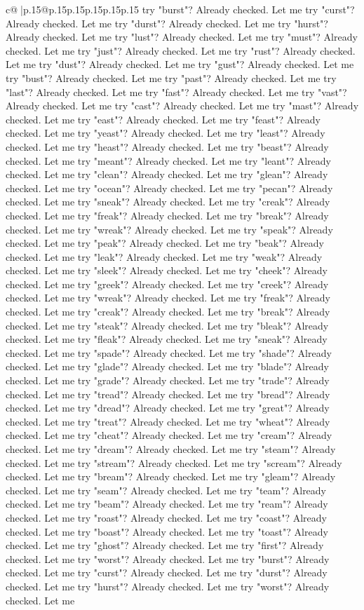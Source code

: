 \documentclass{article}
\begin{document}
{\begin{supertabular}{c@{$\;$}|p{.15\linewidth}@{}p{.15\linewidth}p{.15\linewidth}p{.15\linewidth}p{.15\linewidth}p{.15\linewidth}}
{{{try "burst"? Already checked. Let me try "curst"? Already checked. Let me try "durst"? Already checked. Let me try "hurst"? Already checked. Let me try "lust"? Already checked. Let me try "must"? Already checked. Let me try "just"? Already checked. Let me try "rust"? Already checked. Let me try "dust"? Already checked. Let me try "gust"? Already checked. Let me try "bust"? Already checked. Let me try "past"? Already checked. Let me try "last"? Already checked. Let me try "fast"? Already checked. Let me try "vast"? Already checked. Let me try "cast"? Already checked. Let me try "mast"? Already checked. Let me try "east"? Already checked. Let me try "feast"? Already checked. Let me try "yeast"? Already checked. Let me try "least"? Already checked. Let me try "heast"? Already checked. Let me try "beast"? Already checked. Let me try "meant"? Already checked. Let me try "leant"? Already checked. Let me try "clean"? Already checked. Let me try "glean"? Already checked. Let me try "ocean"? Already checked. Let me try "pecan"? Already checked. Let me try "sneak"? Already checked. Let me try "creak"? Already checked. Let me try "freak"? Already checked. Let me try "break"? Already checked. Let me try "wreak"? Already checked. Let me try "speak"? Already checked. Let me try "peak"? Already checked. Let me try "beak"? Already checked. Let me try "leak"? Already checked. Let me try "weak"? Already checked. Let me try "sleek"? Already checked. Let me try "cheek"? Already checked. Let me try "greek"? Already checked. Let me try "creek"? Already checked. Let me try "wreak"? Already checked. Let me try "freak"? Already checked. Let me try "creak"? Already checked. Let me try "break"? Already checked. Let me try "steak"? Already checked. Let me try "bleak"? Already checked. Let me try "fleak"? Already checked. Let me try "sneak"? Already checked. Let me try "spade"? Already checked. Let me try "shade"? Already checked. Let me try "glade"? Already checked. Let me try "blade"? Already checked. Let me try "grade"? Already checked. Let me try "trade"? Already checked. Let me try "tread"? Already checked. Let me try "bread"? Already checked. Let me try "dread"? Already checked. Let me try "great"? Already checked. Let me try "treat"? Already checked. Let me try "wheat"? Already checked. Let me try "cheat"? Already checked. Let me try "cream"? Already checked. Let me try "dream"? Already checked. Let me try "steam"? Already checked. Let me try "stream"? Already checked. Let me try "scream"? Already checked. Let me try "bream"? Already checked. Let me try "gleam"? Already checked. Let me try "seam"? Already checked. Let me try "team"? Already checked. Let me try "beam"? Already checked. Let me try "ream"? Already checked. Let me try "roast"? Already checked. Let me try "coast"? Already checked. Let me try "boast"? Already checked. Let me try "toast"? Already checked. Let me try "ghost"? Already checked. Let me try "first"? Already checked. Let me try "worst"? Already checked. Let me try "burst"? Already checked. Let me try "curst"? Already checked. Let me try "durst"? Already checked. Let me try "hurst"? Already checked. Let me try "worst"? Already checked. Let me }}}
\end{supertabular}}
\end{document}

